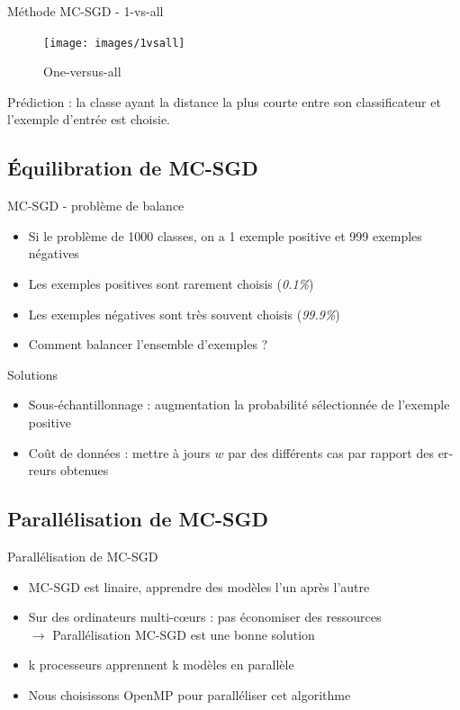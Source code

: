 \documentclass[11pt]{beamer}
\begin{document}
\begin{otherlanguage}{french}
\begin{frame}{Méthode MC-SGD - 1-vs-all}
\begin{figure}[ht!]
\centering
\texttt{[image: images/1vsall]}
\caption{One-versus-all}
\label{fig:1vs1}
\end{figure}
\pause
Prédiction : la classe ayant la distance la plus courte entre son classificateur et l'exemple d'entrée est choisie.
\end{frame}


\subsection{Équilibration de MC-SGD}
\begin{frame}{MC-SGD - problème de balance}
\begin{itemize}
\item Si le problème de 1000 classes, on a 1 exemple positive et 999 exemples négatives
\item Les exemples positives sont rarement choisis (\emph{0.1\%})
\item Les exemples négatives sont très souvent choisis (\emph{99.9\%})
\pause
\item Comment balancer l'ensemble d'exemples ?
\end{itemize}
\pause
Solutions
\begin{itemize}
\item Sous-échantillonnage : augmentation la probabilité sélectionnée de l'exemple positive
\pause
\item Coût de données : mettre à jours $w$ par des différents cas par rapport des erreurs obtenues
\end{itemize}
\end{frame}


\subsection{Parallélisation de MC-SGD}
\begin{frame}{Parallélisation de MC-SGD}
\begin{itemize}
\item MC-SGD est linaire, apprendre des modèles l'un après l'autre
\item Sur des ordinateurs multi-cœurs : pas économiser des ressources\\
\pause
$\rightarrow$ Parallélisation MC-SGD est une bonne solution
\pause
\item k processeurs apprennent k modèles en parallèle
\pause
\item Nous choisissons OpenMP pour paralléliser cet algorithme
\end{itemize}
\end{frame}



\end{otherlanguage}
\end{document}
